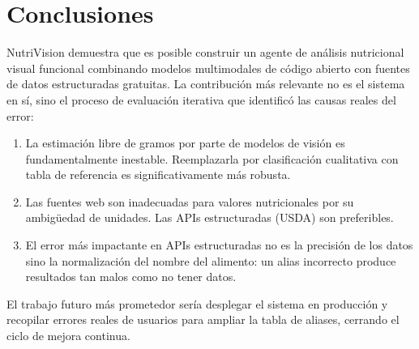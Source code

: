 \documentclass[10pt,a4paper]{article}
\begin{document}
\section{Conclusiones}

NutriVision demuestra que es posible construir un agente de análisis nutricional visual funcional
combinando modelos multimodales de código abierto con fuentes de datos estructuradas gratuitas.
La contribución más relevante no es el sistema en sí, sino el proceso de evaluación iterativa
que identificó las causas reales del error:

\begin{enumerate}[noitemsep, topsep=2pt]
  \item La estimación libre de gramos por parte de modelos de visión es fundamentalmente inestable.
        Reemplazarla por clasificación cualitativa con tabla de referencia es significativamente más
        robusta.
  \item Las fuentes web son inadecuadas para valores nutricionales por su ambigüedad de unidades.
        Las APIs estructuradas (USDA) son preferibles.
  \item El error más impactante en APIs estructuradas no es la precisión de los datos sino la
        normalización del nombre del alimento: un alias incorrecto produce resultados tan malos como
        no tener datos.
\end{enumerate}

El trabajo futuro más prometedor sería desplegar el sistema en producción y recopilar errores reales
de usuarios para ampliar la tabla de aliases, cerrando el ciclo de mejora continua.
\end{document}
